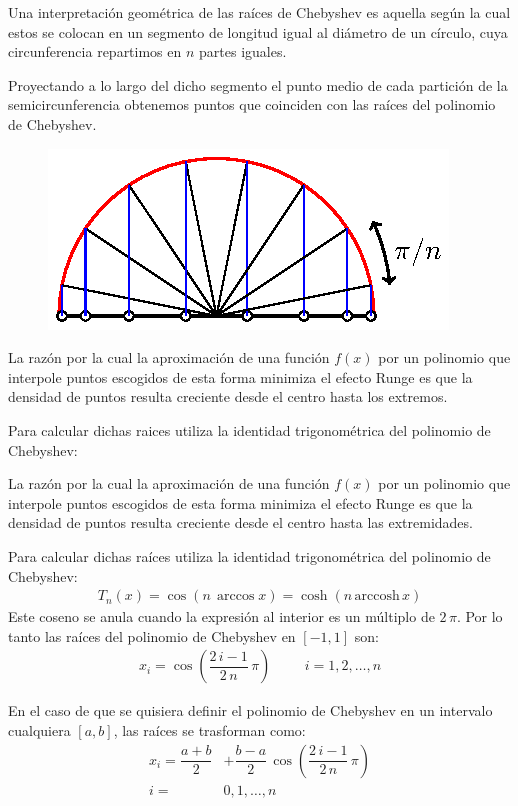 Una interpretación geométrica de las raíces de Chebyshev es aquella según la cual estos se colocan en un segmento de longitud igual al diámetro de un círculo, cuya circunferencia repartimos en $n$ partes iguales.
\par
Proyectando a lo largo del dicho segmento el punto medio de cada partición de la semicircunferencia obtenemos puntos que coinciden con las raíces del polinomio de Chebyshev.
\begin{figure}[H]
    \centering
    \includegraphics[scale=1]{Imagenes/Nodos_Chebychev_01.eps}
\end{figure}

La razón por la cual la aproximación de una función $f(x)$ por un polinomio que interpole puntos escogidos de esta forma minimiza el efecto Runge es que la densidad de puntos resulta creciente desde el centro hasta los extremos.
\par
Para calcular dichas raices utiliza la identidad trigonométrica del polinomio de Chebyshev:

La razón por la cual la aproximación de una función $f(x)$ por un polinomio que interpole puntos escogidos de esta forma minimiza el efecto Runge es que la densidad de puntos resulta creciente desde el centro hasta las extremidades.
\par
Para calcular dichas raíces utiliza la identidad trigonométrica del polinomio de Chebyshev:
\begin{align*}
T_{n}(x) = \cos (n \, \arccos x) = \cosh (n \, \mbox{arccosh} \, x)
\end{align*}
Este coseno se anula cuando la expresión al interior es un múltiplo de $2 \, \pi$.  Por lo tanto las raíces del polinomio de Chebyshev en $[-1,1]$ son:
\begin{align*}
x_{i} = \cos \left( \dfrac{2 \, i - 1}{2 \, n} \, \pi \right) \hspace{1cm} i = 1, 2, \ldots, n
\end{align*}

En el caso de que se quisiera definir el polinomio de Chebyshev en un intervalo cualquiera $[a, b]$, las raíces se trasforman como:
\begin{align*}
x_{i} = \dfrac{a + b}{2} &+ \dfrac{b - a}{2} \, \cos \left( \dfrac{2 \, i - 1}{2 \, n} \, \pi \right) \\[0.5em] 
i =& 0, 1, \ldots, n
\end{align*}

